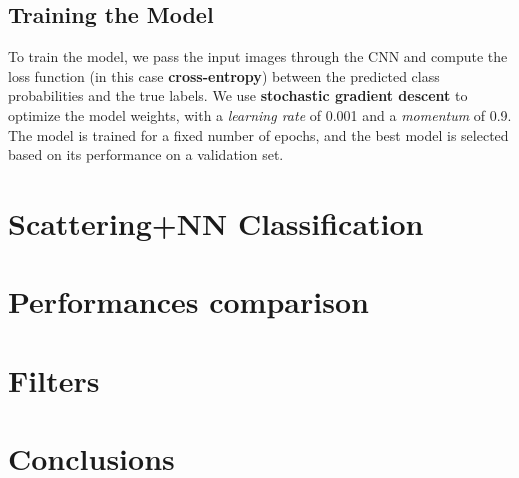 \documentclass{report}
\begin{document}
\section{Training the Model}

To train the model, we pass the input images through the CNN and compute the loss function (in this case \textbf{cross-entropy}) between the predicted class probabilities and the true labels. We use \textbf{stochastic gradient descent} to optimize the model weights, with a \textit{learning rate} of 0.001 and a \textit{momentum} of 0.9. The model is trained for a fixed number of epochs, and the best model is selected based on its performance on a validation set.

\chapter{Scattering+NN Classification}
\chapter{Performances comparison}
\chapter{Filters}
\chapter{Conclusions}
\end{document}
